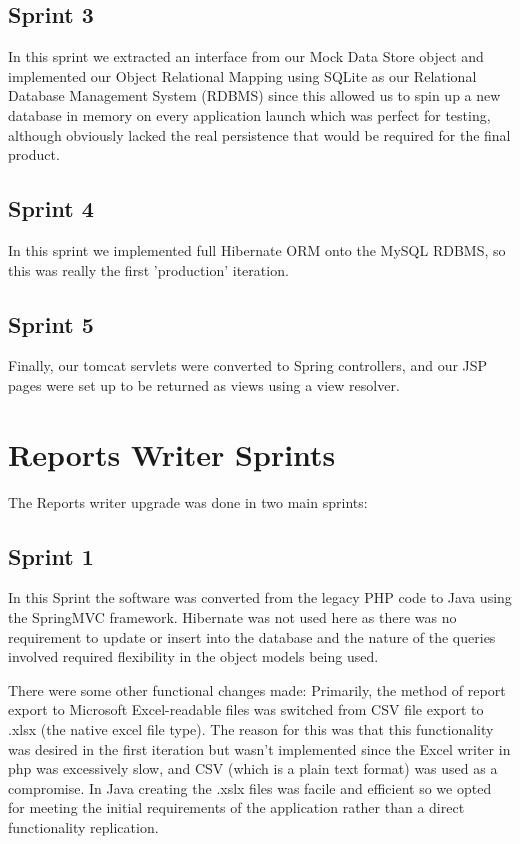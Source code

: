 \subsection{Sprint 3}
In this sprint we extracted an interface from our Mock Data Store object and implemented our Object Relational Mapping using SQLite as our Relational Database Management System (RDBMS) since this allowed us to spin up a new database in memory on every application launch which was perfect for testing, although obviously lacked the real persistence that would be required for the final product.

\subsection{Sprint 4}
In this sprint we implemented full Hibernate ORM onto the MySQL RDBMS, so this was really the first 'production' iteration.

\subsection{Sprint 5}
Finally, our tomcat servlets were converted to Spring controllers, and our JSP pages were set up to be returned as views using a view resolver. 

\section{Reports Writer Sprints}
The Reports writer upgrade was done in two main sprints:

\subsection{Sprint 1}
In this Sprint the software was converted from the legacy PHP code to Java using the SpringMVC framework. Hibernate was not used here as there was no requirement to update or insert into the database and the nature of the queries involved required flexibility in the object models being used.

There were some other functional changes made: Primarily, the method of report export to Microsoft Excel-readable files was switched from CSV file export to .xlsx (the native excel file type). The reason for this was that this functionality was desired in the first iteration but wasn't implemented since the Excel writer in php was excessively slow, and CSV (which is a plain text format) was used as a compromise. In Java creating the .xslx files was facile and efficient so we opted for meeting the initial requirements of the application rather than a direct functionality replication.

